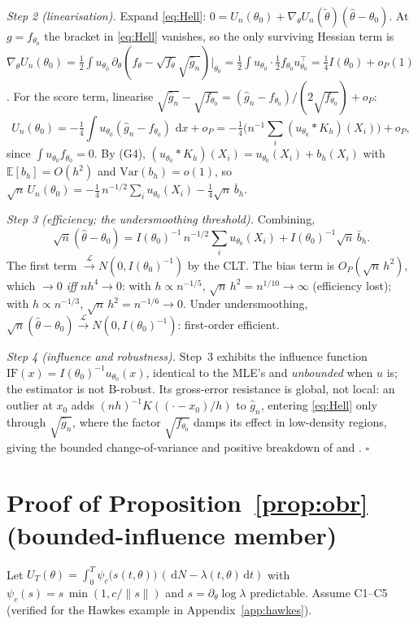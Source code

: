 \documentclass[11pt]{article}
\newcommand{\dd}{\,\mathrm{d}}
\newcommand{\E}{\mathbb{E}}
\newcommand{\toL}{\xrightarrow{\mathcal{L}}}
\begin{document}
\emph{Step 2 (linearisation).} Expand \eqref{eq:Hell}: $0=U_n(\theta_0)+\nabla_\theta U_n(\tilde\theta)(\hat\theta-\theta_0)$.
At $g=f_{\theta_0}$ the bracket in \eqref{eq:Hell} vanishes, so the only surviving
Hessian term is
$\nabla_\theta U_n(\theta_0)=\tfrac12\!\int u_{\theta_0}\,\partial_\theta(f_\theta-\sqrt{f_\theta}\sqrt{\hat g_n})|_{\theta_0}
=\tfrac12\!\int u_{\theta_0}\cdot\tfrac12 f_{\theta_0}u_{\theta_0}^\top=\tfrac14 I(\theta_0)+o_P(1)$.
For the score term, linearise $\sqrt{\hat g_n}-\sqrt{f_{\theta_0}}=(\hat g_n-f_{\theta_0})/(2\sqrt{f_{\theta_0}})+o_P$:
\[
U_n(\theta_0)=-\tfrac14\!\int u_{\theta_0}(\hat g_n-f_{\theta_0})\,\dd x+o_P
=-\tfrac14\Big(n^{-1}\!\sum_i(u_{\theta_0}*K_h)(X_i)\Big)+o_P,
\]
since $\int u_{\theta_0}f_{\theta_0}=0$. By (G4), $(u_{\theta_0}*K_h)(X_i)=u_{\theta_0}(X_i)+b_h(X_i)$
with $\E[b_h]=O(h^2)$ and $\mathrm{Var}(b_h)=o(1)$, so
$\sqrt n\,U_n(\theta_0)=-\tfrac14\,n^{-1/2}\sum_i u_{\theta_0}(X_i)-\tfrac14\sqrt n\,\bar b_h$.

\emph{Step 3 (efficiency; the undersmoothing threshold).} Combining,
\[
\sqrt n(\hat\theta-\theta_0)=I(\theta_0)^{-1}\,n^{-1/2}\!\sum_i u_{\theta_0}(X_i)
+I(\theta_0)^{-1}\sqrt n\,\bar b_h.
\]
The first term $\toL N(0,I(\theta_0)^{-1})$ by the CLT. The bias term is
$O_P(\sqrt n\,h^2)$, which $\to0$ \emph{iff} $nh^4\to0$: with $h\propto n^{-1/5}$,
$\sqrt n\,h^2=n^{1/10}\to\infty$ (efficiency lost); with $h\propto n^{-1/3}$,
$\sqrt n\,h^2=n^{-1/6}\to0$. Under undersmoothing,
$\sqrt n(\hat\theta-\theta_0)\toL N(0,I(\theta_0)^{-1})$: first-order efficient.

\emph{Step 4 (influence and robustness).} Step~3 exhibits the influence function
$\mathrm{IF}(x)=I(\theta_0)^{-1}u_{\theta_0}(x)$, identical to the MLE's and
\emph{unbounded} when $u$ is; the estimator is not B-robust. Its gross-error
resistance is global, not local: an outlier at $x_0$ adds $(nh)^{-1}K((\cdot-x_0)/h)$
to $\hat g_n$, entering \eqref{eq:Hell} only through $\sqrt{\hat g_n}$, where the
factor $\sqrt{f_{\theta_0}}$ damps its effect in low-density regions, giving the
bounded change-of-variance and positive breakdown of \citet{beran1977} and
\citet{lindsay1994}. \hfill$\square$

\section{Proof of Proposition~\ref{prop:obr} (bounded-influence member)}
\label{app:obr}
Let $U_T(\theta)=\int_0^T\psi_c\big(s(t,\theta)\big)\,(\dd N-\lambda(t,\theta)\dd t)$ with
$\psi_c(s)=s\,\min(1,c/\|s\|)$ and $s=\partial_\theta\log\lambda$ predictable. Assume
C1--C5 (verified for the Hawkes example in Appendix~\ref{app:hawkes}).
\end{document}
